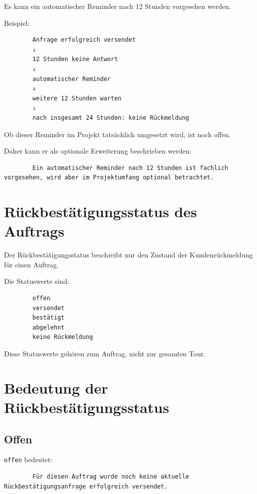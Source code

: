 \documentclass[12pt,a4paper]{article}
\begin{document}
	Es kann ein automatischer Reminder nach 12 Stunden vorgesehen werden.
	
	Beispiel:
	
	\begin{lstlisting}
		Anfrage erfolgreich versendet
		↓
		12 Stunden keine Antwort
		↓
		automatischer Reminder
		↓
		weitere 12 Stunden warten
		↓
		nach insgesamt 24 Stunden: keine Rückmeldung
	\end{lstlisting}
	
	Ob dieser Reminder im Projekt tatsächlich umgesetzt wird, ist noch offen.
	
	Daher kann er als optionale Erweiterung beschrieben werden:
	
	\begin{lstlisting}
		Ein automatischer Reminder nach 12 Stunden ist fachlich vorgesehen, wird aber im Projektumfang optional betrachtet.
	\end{lstlisting}
	
	\section{Rückbestätigungsstatus des Auftrags}
	
	Der Rückbestätigungsstatus beschreibt nur den Zustand der Kundenrückmeldung für einen Auftrag.
	
	Die Statuswerte sind:
	
	\begin{lstlisting}
		offen
		versendet
		bestätigt
		abgelehnt
		keine Rückmeldung
	\end{lstlisting}
	
	Diese Statuswerte gehören zum Auftrag, nicht zur gesamten Tour.
	
	\section{Bedeutung der Rückbestätigungsstatus}
	
	\subsection{Offen}
	
	\texttt{offen} bedeutet:
	
	\begin{lstlisting}
		Für diesen Auftrag wurde noch keine aktuelle Rückbestätigungsanfrage erfolgreich versendet.
	\end{lstlisting}
	
\end{document}

